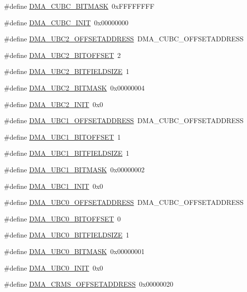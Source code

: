 \begin{DoxyCompactItemize}
\#define \hyperlink{a00547_a50a757f8b7afdafeb9a9ce72799cbbb6}{DMA\_\-CUBC\_\-BITMASK}~0xFFFFFFFF
\item 
\#define \hyperlink{a00547_a585beb2ca81b46173e78cec8544d35fb}{DMA\_\-CUBC\_\-INIT}~0x00000000
\item 
\#define \hyperlink{a00547_a4cbc6b413253fd99a49bf340dd1840d7}{DMA\_\-UBC2\_\-OFFSETADDRESS}~DMA\_\-CUBC\_\-OFFSETADDRESS
\item 
\#define \hyperlink{a00547_ada4233f031183ef63d59438052f3b7b9}{DMA\_\-UBC2\_\-BITOFFSET}~2
\item 
\#define \hyperlink{a00547_a9c414d2c2138cc764fadd4cc108193b2}{DMA\_\-UBC2\_\-BITFIELDSIZE}~1
\item 
\#define \hyperlink{a00547_aac5bcaab524998e45b1a9c6518a4dfdc}{DMA\_\-UBC2\_\-BITMASK}~0x00000004
\item 
\#define \hyperlink{a00547_a5c433d5388778bd7d73919f800246aa8}{DMA\_\-UBC2\_\-INIT}~0x0
\item 
\#define \hyperlink{a00547_a0b26abcc7063d07a8d444322a7298b77}{DMA\_\-UBC1\_\-OFFSETADDRESS}~DMA\_\-CUBC\_\-OFFSETADDRESS
\item 
\#define \hyperlink{a00547_acdb464b248cc252121d84a3ce18d8669}{DMA\_\-UBC1\_\-BITOFFSET}~1
\item 
\#define \hyperlink{a00547_a081663bd259232b0190739875dc8f854}{DMA\_\-UBC1\_\-BITFIELDSIZE}~1
\item 
\#define \hyperlink{a00547_a8a03a43519b98675b8e2b8f74bdb7808}{DMA\_\-UBC1\_\-BITMASK}~0x00000002
\item 
\#define \hyperlink{a00547_a7dc34a4ca9ded0568d6e4d792f892144}{DMA\_\-UBC1\_\-INIT}~0x0
\item 
\#define \hyperlink{a00547_a379cfb51ce3d0e0869d99cc0707562a2}{DMA\_\-UBC0\_\-OFFSETADDRESS}~DMA\_\-CUBC\_\-OFFSETADDRESS
\item 
\#define \hyperlink{a00547_a36678462030ef0892600f230d11a1fe7}{DMA\_\-UBC0\_\-BITOFFSET}~0
\item 
\#define \hyperlink{a00547_a6d33db6d777264fea94bb5ae6407a90f}{DMA\_\-UBC0\_\-BITFIELDSIZE}~1
\item 
\#define \hyperlink{a00547_ab9ec03fa356d8c60b990db7f21824aa2}{DMA\_\-UBC0\_\-BITMASK}~0x00000001
\item 
\#define \hyperlink{a00547_ad75ed5b05e9d95734b846b6aaab6abe5}{DMA\_\-UBC0\_\-INIT}~0x0
\item 
\#define \hyperlink{a00547_aada584c5cb620cb77911f073356bcd45}{DMA\_\-CRMS\_\-OFFSETADDRESS}~0x00000020
\item 

\end{DoxyCompactItemize}
